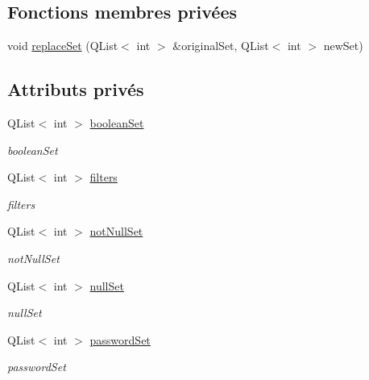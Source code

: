 \subsection*{Fonctions membres privées}
\begin{DoxyCompactItemize}
\item 
void \hyperlink{classSimpleHotel_1_1SH__ExtendedProxyModel_a57ca42214193a4361e00a275c9c64531}{replace\-Set} (Q\-List$<$ int $>$ \&original\-Set, Q\-List$<$ int $>$ new\-Set)
\end{DoxyCompactItemize}
\subsection*{Attributs privés}
\begin{DoxyCompactItemize}
\item 
Q\-List$<$ int $>$ \hyperlink{classSimpleHotel_1_1SH__ExtendedProxyModel_a58b66236a9d0600e55264626d543d960}{boolean\-Set}
\begin{DoxyCompactList}\small\item\em boolean\-Set \end{DoxyCompactList}\item 
Q\-List$<$ int $>$ \hyperlink{classSimpleHotel_1_1SH__ExtendedProxyModel_a65b0d93138f5e83616bd277c038063ce}{filters}
\begin{DoxyCompactList}\small\item\em filters \end{DoxyCompactList}\item 
Q\-List$<$ int $>$ \hyperlink{classSimpleHotel_1_1SH__ExtendedProxyModel_a7c7d8e43d6988da141f1c4ef032839a4}{not\-Null\-Set}
\begin{DoxyCompactList}\small\item\em not\-Null\-Set \end{DoxyCompactList}\item 
Q\-List$<$ int $>$ \hyperlink{classSimpleHotel_1_1SH__ExtendedProxyModel_a3335d384f2c33af3db4db58af0a359e6}{null\-Set}
\begin{DoxyCompactList}\small\item\em null\-Set \end{DoxyCompactList}\item 
Q\-List$<$ int $>$ \hyperlink{classSimpleHotel_1_1SH__ExtendedProxyModel_af630ba54d80971ce64dbbf875f94a073}{password\-Set}
\begin{DoxyCompactList}\small\item\em password\-Set \end{DoxyCompactList}\item 

\end{DoxyCompactItemize}
